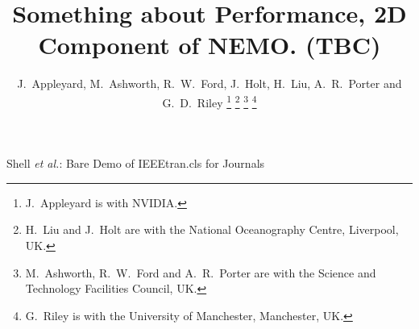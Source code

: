 \documentclass[journal]{IEEEtran}
\begin{document}
%
\title{Something about Performance, 2D Component of NEMO. (TBC)}
%
%

\author{J.~Appleyard, M.~Ashworth, R.~W.~Ford, J.~Holt, H.~Liu, A.~R.~Porter and G.~D.~Riley%
\thanks{J.~Appleyard is with NVIDIA.}%
\thanks{H.~Liu and J.~Holt are with the National Oceanography Centre, Liverpool, UK.}%
\thanks{M.~Ashworth, R.~W.~Ford and A.~R.~Porter are with the Science and Technology Facilities Council, UK.}%
\thanks{G.~Riley is with the University of Manchester, Manchester, UK.}%
}

% 
%


%
{Shell \MakeLowercase{\textit{et al.}}: Bare Demo of IEEEtran.cls for Journals}
% 




\end{document}
